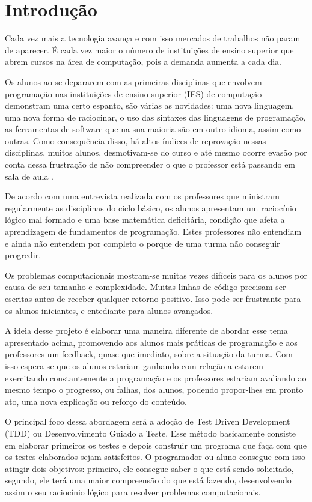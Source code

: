 \documentclass[pnumabnt,normaltoc,espacoumemeio,capchap]{abnt}
\begin{document}
\chapter{Introdução}
\par Cada vez mais a tecnologia avança e com isso mercados de trabalhos não param de aparecer. É cada vez maior o número de instituições de ensino superior que abrem cursos na área de computação, pois a demanda aumenta a cada dia.
\par Os alunos ao se depararem com as primeiras disciplinas que envolvem programação nas instituições de ensino superior (IES) de computação demonstram uma certo espanto, são várias as novidades: uma nova linguagem, uma nova forma de raciocinar, o uso das sintaxes das linguagens de programação, as ferramentas de software que na sua maioria são em outro idioma, assim como outras. Como consequência disso, há altos índices de reprovação nessas disciplinas, muitos alunos, desmotivam-se do curso e até mesmo ocorre evasão por conta dessa frustração de não compreender o que o professor está passando em sala de aula \cite{SI11}.
\par De acordo com uma entrevista realizada com os professores que ministram regularmente as disciplinas do ciclo básico, os alunos apresentam um raciocínio lógico mal formado e uma base matemática deficitária, condição que afeta a aprendizagem de fundamentos de programação. Estes professores não entendiam e ainda não entendem por completo o porque de uma turma não conseguir progredir.  
\par Os problemas computacionais mostram-se muitas vezes difíceis para os alunos por causa de seu tamanho e complexidade. Muitas linhas de código precisam ser escritas antes de receber qualquer retorno positivo. Isso pode ser frustrante para os alunos iniciantes, e entediante para alunos avançados.
\par A ideia desse projeto é elaborar uma maneira diferente de abordar esse tema apresentado acima, promovendo aos alunos mais práticas de programação e aos professores um feedback, quase que imediato, sobre a situação da turma. Com isso espera-se que os alunos estariam ganhando com relação a estarem exercitando constantemente a programação e os professores estariam avaliando ao mesmo tempo o progresso, ou falhas, dos alunos, podendo propor-lhes em pronto ato, uma nova explicação ou reforço do conteúdo.
\par O principal foco dessa abordagem será a adoção de Test Driven Development (TDD) ou Desenvolvimento Guiado a Teste. Esse método basicamente consiste em elaborar primeiros os testes e depois construir um programa que faça com que os testes elaborados sejam satisfeitos. O programador ou aluno consegue com isso atingir dois objetivos: primeiro, ele consegue saber o que está sendo solicitado, segundo, ele terá uma maior compreensão do que está fazendo, desenvolvendo assim o seu raciocínio lógico para resolver problemas computacionais.
\end{document}
